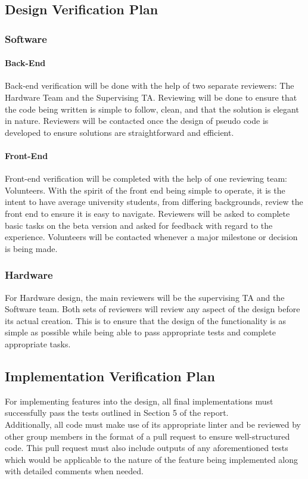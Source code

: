 \documentclass[12pt, titlepage]{article}
\begin{document}
\subsection{Design Verification Plan}
\subsubsection{Software}
\paragraph{Back-End} Back-end verification will be done with the help of two separate reviewers: The Hardware Team and the Supervising TA. Reviewing will be done to ensure that the code being written is simple to follow, clean, and that the solution is elegant in nature. Reviewers will be contacted once the design of pseudo code is developed to ensure solutions are straightforward and efficient.
\paragraph{Front-End}Front-end verification will be completed with the help of one reviewing team: Volunteers. With the spirit of the front end being simple to operate, it is the intent to have average university students, from differing backgrounds, review the front end to ensure it is easy to navigate. Reviewers will be asked to complete basic tasks on the beta version and asked for feedback with regard to the experience. Volunteers will be contacted whenever a major milestone or decision is being made.
\subsubsection{Hardware}
For Hardware design, the main reviewers will be the supervising TA and the Software team. Both sets of reviewers will review any aspect of the design before its actual creation. This is to ensure that the design of the functionality is as simple as possible while being able to pass appropriate tests and complete appropriate tasks.


\subsection{Implementation Verification Plan}
For implementing features into the design, all final implementations must successfully pass the tests outlined in Section 5 of the report.\\
Additionally, all code must make use of its appropriate linter and be reviewed by other group members in the format of a pull request to ensure well-structured code. This pull request must also include outputs of any aforementioned tests which would be applicable to the nature of the feature being implemented along with detailed comments when needed.
\end{document}

